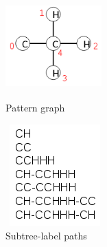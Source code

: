 \documentclass{l4proj}
\theoremstyle{definition}
\begin{document}
\begin{figure}[h]
  \begin{minipage}[t]{.5\textwidth}
    \centering
    \includegraphics[height=3.3cm,width=3.7cm]{images/graphs/C2H3.png}
    \caption{Pattern graph}
    \label{C2H3}
  \end{minipage}
  \begin{minipage}[t]{.5\textwidth}
  \centering
  \includegraphics[height=3.9cm,width=3.8cm]{images/paths/C2H3-isomer-paths.png}
  \caption{Subtree-label paths}
  \label{C2H3-subtree-label-paths}
  \end{minipage}
\end{figure}
\end{document}

